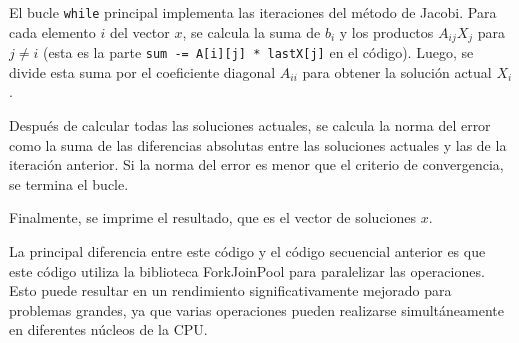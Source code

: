 \documentclass[]{article}
\begin{document}
El bucle \texttt{while} principal implementa las iteraciones del método de Jacobi. Para cada elemento $i$ del vector $x$, se calcula la suma de $b_i$ y los productos $A_{ij}X_j$ para $j \neq i$ (esta es la parte \texttt{sum -= A[i][j] * lastX[j]} en el código). Luego, se divide esta suma por el coeficiente diagonal $A_{ii}$ para obtener la solución actual $X_i$.

Después de calcular todas las soluciones actuales, se calcula la norma del error como la suma de las diferencias absolutas entre las soluciones actuales y las de la iteración anterior. Si la norma del error es menor que el criterio de convergencia, se termina el bucle.

Finalmente, se imprime el resultado, que es el vector de soluciones $x$.

La principal diferencia entre este código y el código secuencial anterior es que este código utiliza la biblioteca ForkJoinPool para paralelizar las operaciones. Esto puede resultar en un rendimiento significativamente mejorado para problemas grandes, ya que varias operaciones pueden realizarse simultáneamente en diferentes núcleos de la CPU.
\end{document}
